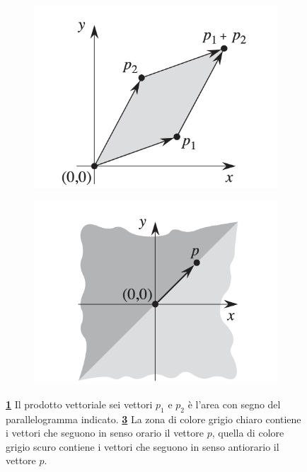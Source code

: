 \documentclass[12pt,a4paper]{report}
\begin{document}
\begin{figure}[ht]
\centering
 \begin{subfigure}{.4\textwidth}
    \centering
    \includegraphics[width=1\linewidth]{crossproduct.png}
    \caption{}
    \label{fig:crossproduct}
 \end{subfigure}
 \begin{subfigure}{.4\textwidth}
    \centering
    \includegraphics[width=1\linewidth]{crossproductturn.png}
    \caption{}
    \label{fig:crossproductturn}
 \end{subfigure}
 \caption{\textbf{\ref{fig:crossproduct}} Il prodotto vettoriale sei vettori $p_1$ e $p_2$ è l'area con segno del parallelogramma indicato. \textbf{\ref{fig:crossproductturn}} La zona di colore grigio chiaro contiene i vettori che seguono in senso orario il vettore $p$, quella di colore grigio scuro contiene i vettori che seguono in senso antiorario il vettore $p$.}
\end{figure}
\end{document}
